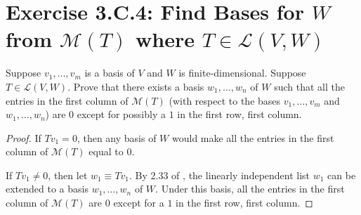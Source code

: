 \section{Exercise 3.C.4: Find Bases for $W$ from $\mathcal{M}(T)$ where $T\in\mathcal{L}(V,W)$}
Suppose $v_1,\dots,v_m$ is a basis of $V$ and $W$ is finite-dimensional. Suppose $T\in\mathcal{L}(V,W)$. Prove that there exists a basis $w_1,\dots,w_n$ of $W$ such that all the entries in the first column of $\mathcal{M}(T)$ (with respect to the bases $v_1,\dots,v_m$ and $w_1,\dots,w_n$) are $0$ except for possibly a $1$ in the first row, first column.
\begin{proof}
If $Tv_1=0$, then any basis of $W$ would make all the entries in the first column of $\mathcal{M}(T)$ equal to $0$.

If $Tv_1\ne 0$, then let $w_1\equiv Tv_1$. By 2.33 of \cite{axler2014linear}, the linearly independent list $w_1$ can be extended to a basis $w_1,\dots,w_n$ of $W$. Under this basis, all the entries in the first column of $\mathcal{M}(T)$ are $0$ except for a $1$ in the first row, first column.
\end{proof}
